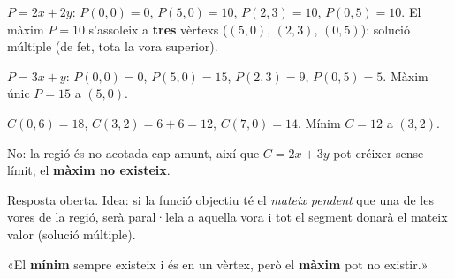 \begin{solucions}
\begin{sollist}
  \item $P=2x+2y$: $P(0,0)=0$, $P(5,0)=10$, $P(2,3)=10$, $P(0,5)=10$. El màxim $P=10$
        s'assoleix a \textbf{tres} vèrtexs ($(5,0)$, $(2,3)$, $(0,5)$): solució múltiple
        (de fet, tota la vora superior).
  \item $P=3x+y$: $P(0,0)=0$, $P(5,0)=15$, $P(2,3)=9$, $P(0,5)=5$. Màxim únic $P=15$
        a $(5,0)$.
  \item $C(0,6)=18$, $C(3,2)=6+6=12$, $C(7,0)=14$. Mínim $C=12$ a $(3,2)$.
  \item No: la regió és no acotada cap amunt, així que $C=2x+3y$ pot créixer sense
        límit; el \textbf{màxim no existeix}.
  \item Resposta oberta. Idea: si la funció objectiu té el \emph{mateix pendent} que
        una de les vores de la regió, serà paral·lela a aquella vora i tot el segment
        donarà el mateix valor (solució múltiple).
  \item «El \textbf{mínim} sempre existeix i és en un vèrtex, però el \textbf{màxim}
        pot no existir.»
\end{sollist}
\end{solucions}
